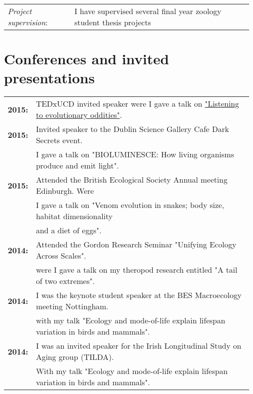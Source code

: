 \documentclass[10pt,a4paper]{article}
\begin{document}
\begin{tabular}{ll}
\textit{Project supervision}:&\hspace{5.7mm} I have supervised several final year zoology student thesis projects\\

\end{tabular}





\section{Conferences and invited presentations}

\raggedright
\begin{tabular}{ll}
\textbf{2015:} & TEDxUCD invited speaker were I gave a talk on \href{https://www.youtube.com/watch?v=-CHtfWEKifY}{"Listening to evolutionary oddities"}.\\ 
\textbf{2015:} & Invited speaker to the Dublin Science Gallery Cafe Dark Secrets event.\\ 
& I gave a talk on "BIOLUMINESCE: How living organisms produce and emit light".\\
\textbf{2015:} & Attended the British Ecological Society Annual meeting Edinburgh. Were\\ 
& I gave a talk on "Venom evolution in snakes; body size, habitat dimensionality\\
&and a diet of eggs".\\
\textbf{2014:} & Attended the Gordon Research Seminar "Unifying Ecology Across Scales".\\ 
& were I gave a talk on my theropod research entitled "A tail of two extremes".\\
\textbf{2014:} & I was the keynote student speaker at the BES Macroecology meeting Nottingham.\\ 
& with my talk "Ecology and mode-of-life explain lifespan variation in birds and mammals".\\
\textbf{2014:} & I was an invited speaker for the Irish Longitudinal Study on Aging group (TILDA).\\ 
& With my talk "Ecology and mode-of-life explain lifespan variation in birds and mammals".\\

\end{tabular}
\end{document}
